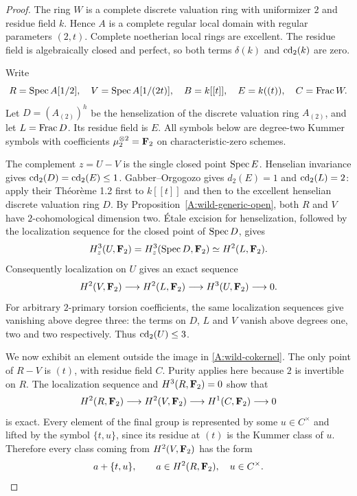 \begin{proof}
The ring $W$ is a complete discrete valuation ring with uniformizer $2$
and residue field $k$. Hence $A$ is a complete regular local domain with
regular parameters $(2,t)$. Complete noetherian local rings are excellent.
The residue field is algebraically closed and perfect, so both terms
$\delta(k)$ and $\operatorname{cd}_2(k)$ are zero.

Write
\[
 R=\operatorname{Spec} A[1/2],\quad V=\operatorname{Spec} A[1/(2t)],\quad
 B=k[[t]],\quad E=k((t)),\quad C=\operatorname{Frac} W.
\]
Let $D=(A_{(2)})^h$ be the henselization of the discrete valuation ring
$A_{(2)}$, and let $L=\operatorname{Frac} D$. Its residue field is $E$.
All symbols below are degree-two Kummer symbols with coefficients
$\mu_2^{\otimes2}=\mathbf F_2$ on characteristic-zero schemes.

The complement $z=U-V$ is the single closed point $\operatorname{Spec} E$.
Henselian invariance gives $\operatorname{cd}_2(D)=\operatorname{cd}_2(E)\leq1$.
Gabber--Orgogozo gives $d_2(E)=1$ and $\operatorname{cd}_2(L)=2$:
apply their Th\'eor\`eme 1.2 first to $k[[t]]$ and then to the excellent
henselian discrete valuation ring $D$.
By Proposition~\ref{A:wild-generic-open}, both $R$ and $V$ have
$2$-cohomological dimension two.
\'Etale excision for henselization, followed by the localization sequence
for the closed point of $\operatorname{Spec} D$, gives
\[
 H^3_z(U,\mathbf F_2)=H^3_z(\operatorname{Spec} D,\mathbf F_2)
       \simeq H^2(L,\mathbf F_2).
\]
Consequently localization on $U$ gives an exact sequence
\begin{equation}\label{A:wild-cokernel}
 H^2(V,\mathbf F_2)\longrightarrow H^2(L,\mathbf F_2)
       \longrightarrow H^3(U,\mathbf F_2)\longrightarrow0.
\end{equation}
For arbitrary $2$-primary torsion coefficients, the same localization
sequences give vanishing above degree three: the terms on $D$, $L$ and
$V$ vanish above degrees one, two and two respectively. Thus
$\operatorname{cd}_2(U)\leq3$.

We now exhibit an element outside the image in
\eqref{A:wild-cokernel}. The only point of $R-V$ is $(t)$, with residue
field $C$. Purity applies here because $2$ is invertible on $R$.
The localization sequence and $H^3(R,\mathbf F_2)=0$ show that
\[
 H^2(R,\mathbf F_2)\longrightarrow H^2(V,\mathbf F_2)
       \longrightarrow H^1(C,\mathbf F_2)\longrightarrow0
\]
is exact. Every element of the final group is represented by some
$u\in C^\times$ and lifted by the symbol $\{t,u\}$, since its residue
at $(t)$ is the Kummer class of $u$. Therefore every class coming from
$H^2(V,\mathbf F_2)$ has the form
\begin{equation}\label{A:wild-image-form}
 a+\{t,u\},\qquad a\in H^2(R,\mathbf F_2),\quad u\in C^\times.
\end{equation}


\end{proof}
